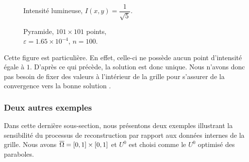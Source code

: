 \begin{figure}[!htb]
    \begin{minipage}[t]{0.48\textwidth}
        \centering
        \caption{Intensité lumineuse,  \centering $I(x,y)=\dfrac{1}{\sqrt{5}}.$}\label{Fig:int_pyramide}
    \end{minipage}\hfill
    \begin{minipage}[t]{0.48\textwidth}
        \centering
        \caption{Pyramide, $101\times101 $ points, \\[1ex] \centering$\varepsilon=1.65 \times 10^{-4}$, $n=100$.}\label{Fig:pyramide}
    \end{minipage}
\end{figure}
\newpage
Cette figure est particulière. En effet, celle-ci ne possède aucun point d'intensité égale à $1$. D'après ce qui précède, la solution est donc unique. Nous n'avons donc pas besoin de fixer des valeurs à l'intérieur de la grille pour s'assurer de la convergence vers \og la bonne solution \fg.

\subsubsection{Deux autres exemples}
Dans cette dernière sous-section, nous présentons deux exemples illustrant la sensibilité du processus de reconstruction par rapport aux données internes de la grille. Nous avons $\overline{\Omega} = \mathopen{}\left[0,1\right]\mathclose{}\times \mathopen{}\left[0,1\right]\mathclose{}$ et $U^0$ est choisi comme le $U^0$ optimisé des paraboles.

